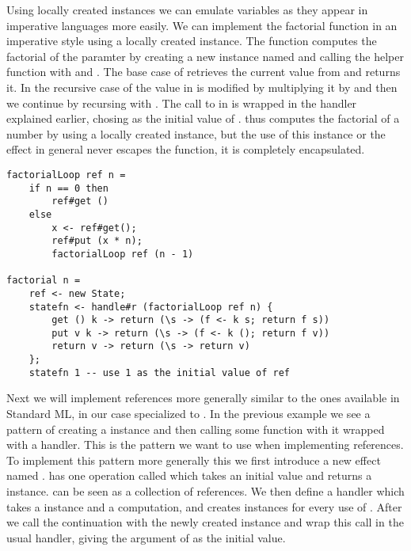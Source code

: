Using locally created instances we can emulate variables as they appear in imperative languages more easily.
We can implement the factorial function in an imperative style using a locally created  instance.
The  function computes the factorial of the paramter  by creating a new  instance named  and calling the helper function  with  and .
The base case of  retrieves the current value from  and returns it.
In the recursive case of  the value in  is modified by multiplying it by  and then we continue by recursing with .
The call to  in  is wrapped in the  handler explained earlier, chosing  as the initial value of .
 thus computes the factorial of a number by using a locally created instance, but the use of this instance or the  effect in general never escapes the function, it is completely encapsulated.

\begin{verbatim}
factorialLoop ref n =
	if n == 0 then
		ref#get ()
	else
		x <- ref#get();
		ref#put (x * n);
		factorialLoop ref (n - 1) 

factorial n =
	ref <- new State;
	statefn <- handle#r (factorialLoop ref n) {
		get () k -> return (\s -> (f <- k s; return f s))
		put v k -> return (\s -> (f <- k (); return f v))
		return v -> return (\s -> return v)
	};
	statefn 1 -- use 1 as the initial value of ref
\end{verbatim}

Next we will implement references more generally similar to the ones available in Standard ML\cite{standardml}, in our case specialized to .
In the previous example we see a pattern of creating a  instance and then calling some function with it wrapped with a handler.
This is the pattern we want to use when implementing references.
To implement this pattern more generally this we first introduce a new effect named .
 has one operation called  which takes an initial value  and returns a  instance.
 can be seen as a collection of references.
We then define a handler  which takes a  instance and a computation, and creates  instances for every use of . After we call the continuation with the newly created instance and wrap this call in the usual  handler, giving the argument of  as the initial value.

